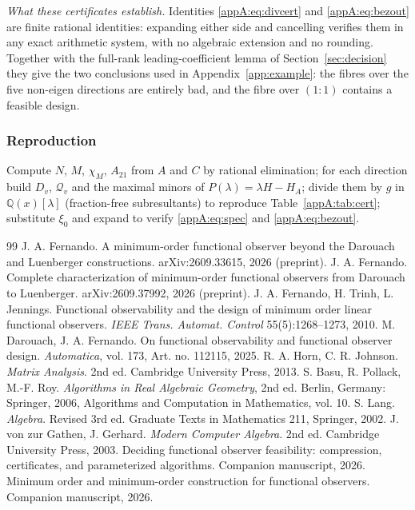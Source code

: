 \documentclass[journal]{IEEEtran}
\theoremstyle{plainn}
\theoremstyle{remark}
\begin{document}
\emph{What these certificates establish.} Identities \eqref{appA:eq:divcert} and
\eqref{appA:eq:bezout} are finite rational identities: expanding either side and cancelling verifies
them in any exact arithmetic system, with no algebraic extension and no rounding. Together with the
full-rank leading-coefficient lemma of Section~\ref{sec:decision} they give the two conclusions used in
Appendix~\ref{app:example}: the fibres over the five non-eigen directions are entirely bad, and
the fibre over $(1\!:\!1)$ contains a feasible design.


\subsubsection{Reproduction}


Compute $N$, $M$, $\chi_M$, $A_{21}$ from $A$ and $C$ by rational elimination; for each direction build
$D_v$, $\mathcal Q_v$ and the maximal minors of $P(\lambda)=\lambda H-H_A$; divide them by $g$ in
$\mathbb Q(x)[\lambda]$ (fraction-free subresultants) to reproduce Table~\ref{appA:tab:cert}; substitute
$\xi_0$ and expand to verify \eqref{appA:eq:spec} and \eqref{appA:eq:bezout}.


\normalsize



\begin{thebibliography}{99}
 J. A. Fernando. A minimum-order functional observer beyond the Darouach and Luenberger constructions. arXiv:2609.33615, 2026 (preprint).
 J. A. Fernando. Complete characterization of minimum-order functional observers from Darouach to Luenberger. arXiv:2609.37992, 2026 (preprint).
 J. A. Fernando, H. Trinh, L. Jennings. Functional observability and the design of minimum order linear functional observers. \emph{IEEE Trans. Automat. Control} 55(5):1268--1273, 2010.
 M. Darouach, J. A. Fernando. On functional observability and functional observer design. \emph{Automatica}, vol. 173, Art. no. 112115, 2025.
 R. A. Horn, C. R. Johnson. \emph{Matrix Analysis}. 2nd ed. Cambridge University Press, 2013.
 S. Basu, R. Pollack, M.-F. Roy. \emph{Algorithms in Real Algebraic Geometry}, 2nd ed. Berlin, Germany: Springer, 2006, Algorithms and Computation in Mathematics, vol. 10.
 S. Lang. \emph{Algebra}. Revised 3rd ed. Graduate Texts in Mathematics 211, Springer, 2002.
 J. von zur Gathen, J. Gerhard. \emph{Modern Computer Algebra}. 2nd ed. Cambridge University Press, 2003.
 Deciding functional observer feasibility: compression, certificates, and parameterized algorithms. Companion manuscript, 2026.
 Minimum order and minimum-order construction for functional observers. Companion manuscript, 2026.
\end{thebibliography}
\end{document}
